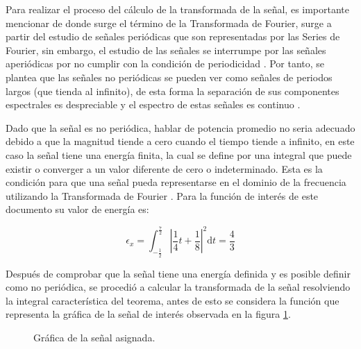 \documentclass[11pt,letterpaper,twocolumn]{article}
\begin{document}
    Para realizar el proceso del cálculo de la transformada de la señal, es importante mencionar
    de donde surge el término de la Transformada de Fourier, surge a partir del estudio de señales
    periódicas que son representadas por las Series de Fourier, sin embargo, el estudio de las 
    señales se interrumpe por las señales aperiódicas por no cumplir con la condición de periodicidad
    \cite{Sauchelli2020}. Por tanto, se plantea que las señales no periódicas se pueden ver como 
    señales de periodos largos (que tienda al infinito), de esta forma la separación de sus 
    componentes espectrales es despreciable y el espectro de estas señales es continuo \cite{Silva2021}.
    
    Dado que la señal es no periódica, hablar de potencia promedio no seria adecuado debido a que 
    la magnitud tiende a cero cuando el tiempo tiende a infinito, en este caso la señal tiene una
    energía finita, la cual se define por una integral que puede existir o converger a un valor
    diferente de cero o indeterminado. Esta es la condición para que una señal pueda representarse
    en el dominio de la frecuencia utilizando la Transformada de Fourier \cite{Fabian}. Para la función de interés
    de este documento su valor de energía es:
    
    \begin{equation*}
        \epsilon_x=\int_{-\frac{1}{2}}^{\frac{7}{2}}\left|\frac{1}{4}t + \frac{1}{8}\right|^2 \mathrm{d}t = \frac{4}{3}
    \end{equation*}

    Después de comprobar que la señal tiene una energía definida y es posible definir como no
    periódica, se procedió a calcular la transformada de la señal resolviendo la integral 
    característica del teorema, antes de esto se considera la función que representa la gráfica 
    de la señal de interés observada en la figura \ref{funcionAsiganda}.

    \begin{figure}[h!]
        \centering
        \caption{Gráfica de la señal asignada.}
        \label{funcionAsiganda}
    \end{figure}
\end{document}
